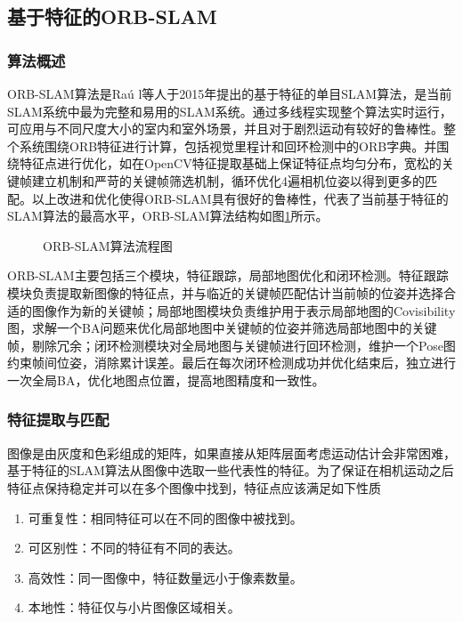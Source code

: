 \subsection{基于特征的ORB-SLAM}

\subsubsection*{算法概述}
ORB-SLAM算法是Ra\'u l等人于2015年提出的基于特征的单目SLAM算法，是当前SLAM系统中最为完整和易用的SLAM系统。通过多线程实现整个算法实时运行，可应用与不同尺度大小的室内和室外场景，并且对于剧烈运动有较好的鲁棒性。整个系统围绕ORB特征进行计算，包括视觉里程计和回环检测中的ORB字典。并围绕特征点进行优化，如在OpenCV特征提取基础上保证特征点均匀分布，宽松的关键帧建立机制和严苛的关键帧筛选机制，循环优化4遍相机位姿以得到更多的匹配。以上改进和优化使得ORB-SLAM具有很好的鲁棒性，代表了当前基于特征的SLAM算法的最高水平，ORB-SLAM算法结构如图\ref{fig3.6}所示。
\begin{figure}
\centering
\caption{ORB-SLAM算法流程图}
\label{fig3.6}
\end{figure}

ORB-SLAM主要包括三个模块，特征跟踪，局部地图优化和闭环检测。特征跟踪模块负责提取新图像的特征点，并与临近的关键帧匹配估计当前帧的位姿并选择合适的图像作为新的关键帧；局部地图模块负责维护用于表示局部地图的Covisibility图，求解一个BA问题来优化局部地图中关键帧的位姿并筛选局部地图中的关键帧，剔除冗余；闭环检测模块对全局地图与关键帧进行回环检测，维护一个Pose图约束帧间位姿，消除累计误差。最后在每次闭环检测成功并优化结束后，独立进行一次全局BA，优化地图点位置，提高地图精度和一致性。


\subsubsection*{特征提取与匹配}
图像是由灰度和色彩组成的矩阵，如果直接从矩阵层面考虑运动估计会非常困难，基于特征的SLAM算法从图像中选取一些代表性的特征。为了保证在相机运动之后特征点保持稳定并可以在多个图像中找到，特征点应该满足如下性质
\begin{enumerate}[label={(\arabic*)}]
\item 可重复性：相同特征可以在不同的图像中被找到。
\item 可区别性：不同的特征有不同的表达。
\item 高效性：同一图像中，特征数量远小于像素数量。
\item 本地性：特征仅与小片图像区域相关。
\end{enumerate}

